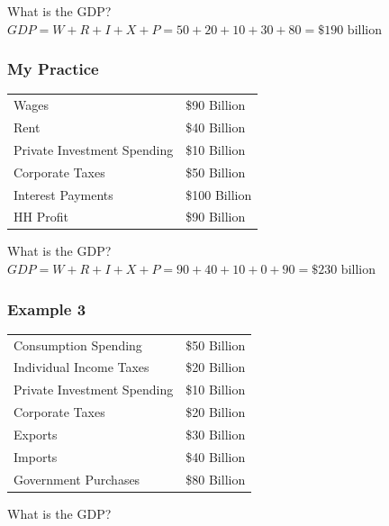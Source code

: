 \documentclass[
  letterpaper,
  DIV=11,
  numbers=noendperiod]{scrartcl}
\begin{document}
What is the GDP?
\(GDP = W + R + I + X + P = 50 + 20 + 10 + 30 + 80 = \$190 \text{ billion}\)

\hypertarget{my-practice-1}{%
\subsubsection{My Practice}\label{my-practice-1}}

\begin{longtable}[]{@{}
  >{\raggedright\arraybackslash}p{}
  >{\raggedright\arraybackslash}p{}@{}}
\toprule\noalign{}
\endhead
\bottomrule\noalign{}
\endlastfoot
Wages & \$90 Billion \\
Rent & \$40 Billion \\
Private Investment Spending & \$10 Billion \\
Corporate Taxes & \$50 Billion \\
Interest Payments & \$100 Billion \\
HH Profit & \$90 Billion \\
\end{longtable}

What is the GDP?
\(GDP = W + R + I + X + P = 90 + 40 + 10 + 0 + 90 = \$230 \text{ billion}\)

\hypertarget{example-3}{%
\subsubsection{Example 3}\label{example-3}}

\begin{longtable}[]{@{}
  >{\raggedright\arraybackslash}p{}
  >{\raggedright\arraybackslash}p{}@{}}
\toprule\noalign{}
\endhead
\bottomrule\noalign{}
\endlastfoot
Consumption Spending & \$50 Billion \\
Individual Income Taxes & \$20 Billion \\
Private Investment Spending & \$10 Billion \\
Corporate Taxes & \$20 Billion \\
Exports & \$30 Billion \\
Imports & \$40 Billion \\
Government Purchases & \$80 Billion \\
\end{longtable}

What is the GDP?
\end{document}
